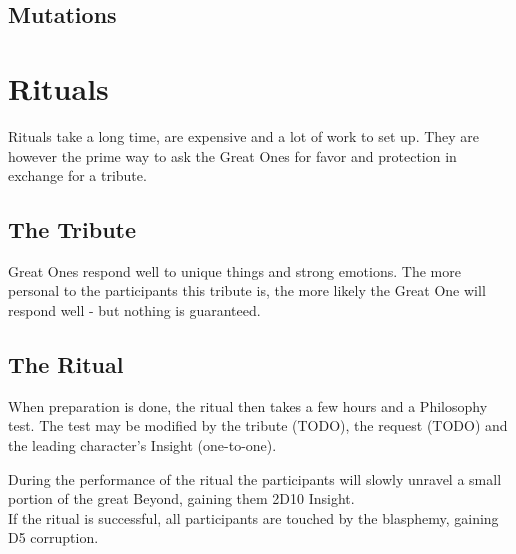 \documentclass[12pt,a4paper,openany]{book}
\begin{document}
	\section*{Mutations}
	\vspace{4mm}
	\begin{multicols}{2}
	\end{multicols}
	
	\chapter{Rituals}
	Rituals take a long time, are expensive and a lot of work to set up. They are however the prime way to ask the Great Ones for favor and protection in exchange for a tribute.
	\section{The Tribute}
	Great Ones respond well to unique things and strong emotions. The more personal to the participants this tribute is, the more likely the Great One will respond well - but nothing is guaranteed.
	\section{The Ritual}
	When preparation is done, the ritual then takes a few hours and a Philosophy test. The test may be modified by the tribute (TODO), the request (TODO) and the leading character's Insight (one-to-one).%
	\par
	During the performance of the ritual the participants will slowly unravel a small portion of the great Beyond, gaining them 2D10 Insight.\\
	If the ritual is successful, all participants are touched by the blasphemy, gaining D5 corruption.
\end{document}
